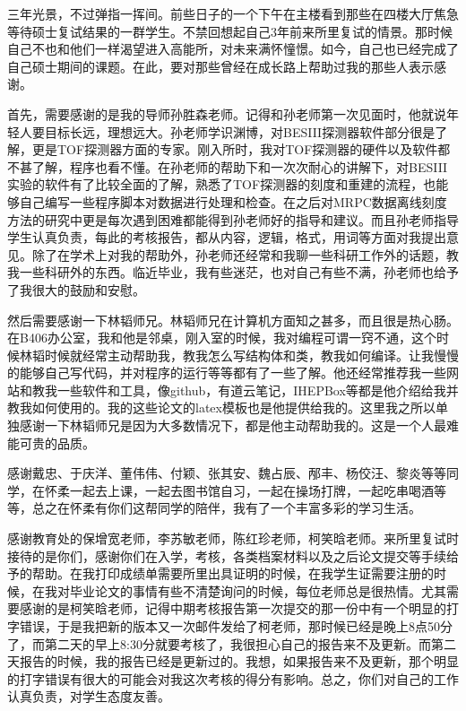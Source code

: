 \begin{thanks}

三年光景，不过弹指一挥间。前些日子的一个下午在主楼看到那些在四楼大厅焦急等待硕士复试结果的一群学生。不禁回想起自己3年前来所里复试的情景。那时候自己不也和他们一样渴望进入高能所，对未来满怀憧憬。如今，自己也已经完成了自己硕士期间的课题。在此，要对那些曾经在成长路上帮助过我的那些人表示感谢。

首先，需要感谢的是我的导师孙胜森老师。记得和孙老师第一次见面时，他就说年轻人要目标长远，理想远大。孙老师学识渊博，对BESIII探测器软件部分很是了解，更是TOF探测器方面的专家。刚入所时，我对TOF探测器的硬件以及软件都不甚了解，程序也看不懂。在孙老师的帮助下和一次次耐心的讲解下，对BESIII实验的软件有了比较全面的了解，熟悉了TOF探测器的刻度和重建的流程，也能够自己编写一些程序脚本对数据进行处理和检查。在之后对MRPC数据离线刻度方法的研究中更是每次遇到困难都能得到孙老师好的指导和建议。而且孙老师指导学生认真负责，每此的考核报告，都从内容，逻辑，格式，用词等方面对我提出意见。除了在学术上对我的帮助外，孙老师还经常和我聊一些科研工作外的话题，教我一些科研外的东西。临近毕业，我有些迷茫，也对自己有些不满，孙老师也给予了我很大的鼓励和安慰。

然后需要感谢一下林韬师兄。林韬师兄在计算机方面知之甚多，而且很是热心肠。在B406办公室，我和他是邻桌，刚入室的时候，我对编程可谓一窍不通，这个时候林韬时候就经常主动帮助我，教我怎么写结构体和类，教我如何编译。让我慢慢的能够自己写代码，并对程序的运行等等都有了一些了解。他还经常推荐我一些网站和教我一些软件和工具，像github，有道云笔记，IHEPBox等都是他介绍给我并教我如何使用的。我的这些论文的latex模板也是他提供给我的。这里我之所以单独感谢一下林韬师兄是因为大多数情况下，都是他主动帮助我的。这是一个人最难能可贵的品质。

感谢戴忠、于庆洋、董伟伟、付颖、张其安、魏占辰、邴丰、杨佼汪、黎炎等等同学，在怀柔一起去上课，一起去图书馆自习，一起在操场打牌，一起吃串喝酒等等，总之在怀柔有你们这帮同学的陪伴，我有了一个丰富多彩的学习生活。

感谢教育处的保增宽老师，李苏敏老师，陈红珍老师，柯笑晗老师。来所里复试时接待的是你们，感谢你们在入学，考核，各类档案材料以及之后论文提交等手续给予的帮助。在我打印成绩单需要所里出具证明的时候，在我学生证需要注册的时候，在我对毕业论文的事情有些不清楚询问的时候，每位老师总是很热情。尤其需要感谢的是柯笑晗老师，记得中期考核报告第一次提交的那一份中有一个明显的打字错误，于是我把新的版本又一次邮件发给了柯老师，那时候已经是晚上8点50分了，而第二天的早上8:30分就要考核了，我很担心自己的报告来不及更新。而第二天报告的时候，我的报告已经是更新过的。我想，如果报告来不及更新，那个明显的打字错误有很大的可能会对我这次考核的得分有影响。总之，你们对自己的工作认真负责，对学生态度友善。


\end{thanks}
